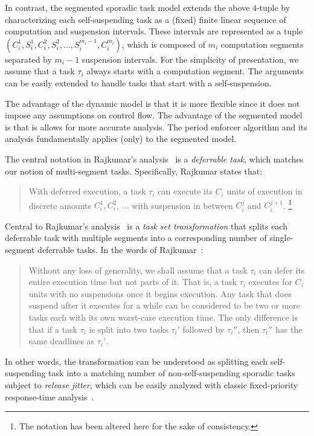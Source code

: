 In contrast, the segmented sporadic task model extends the above $4$-tuple by characterizing each self-suspending task as a (fixed) finite linear sequence of computation and suspension intervals. These intervals are represented as a tuple
$(C_{i}^1,S_{i}^1,C_{i}^2,S_{i}^2,...,S_{i}^{m_i-1},C_{i}^{m_i})$, which is composed of $m_i$ computation segments separated by $m_i-1$ suspension intervals. For the simplicity of presentation, we assume that a task $\tau_i$ always starts with a computation segment. The arguments can be easily extended to handle tasks that start with a self-suspension.

The advantage of the dynamic model is that it is more flexible since it does not impose any assumptions on control flow. The advantage of the segmented model is that is allows for more accurate analysis. The period enforcer algorithm and its analysis fundamentally applies (only) to the segmented model.

The central notation in Rajkumar's analysis~\cite{Raj:suspension1991} is a \emph{deferrable task}, which matches our notion of multi-segment tasks.  Specifically, Rajkumar states that:
\begin{quote}
With deferred execution, a task $\tau_i$ can execute its $C_i$ units of execution in discrete amounts $C_i^1, C_i^2$, $\ldots$ with suspension in between $C_i^j$ and $C_i^{j+1}$. \cite[Section 3]{Raj:suspension1991}\footnote{The notation has been altered here for the sake of consistency.} 
\end{quote}
%
Central to Rajkumar's analysis~\cite{Raj:suspension1991} is a \emph{task set transformation} that splits each deferrable task with multiple segments into a corresponding number of single-segment deferrable tasks.  In the words of Rajkumar~\cite[Section 3]{Raj:suspension1991}:

\begin{quote}
	 Without any loss of generality, we shall assume that a task $\tau_i$ can defer its entire execution time but not parts of it. That is, a task $\tau_i$ executes for $C_i$ units with no suspensions once it begins execution. Any task that does suspend after it executes for a while can be considered to be two or more tasks each with its own worst-case execution time. The only difference is that if a task $\tau_i$ is split into two tasks $\tau_i'$ followed by $\tau_i''$, then $\tau_i''$ has the same deadlines as $\tau_i{{'}}$. 
\end{quote}
%
In other words, the transformation can be understood as splitting each self-suspending task into a matching number of non-self-suspending sporadic tasks subject to \emph{release jitter}, which can be easily analyzed with classic fixed-priority response-time analysis~\cite{ABRTW:93}.

